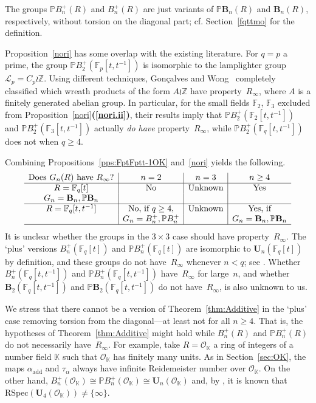 \documentclass[a4paper,11pt]{amsart}
\numberwithin{equation}{section}
\theoremstyle{plain}
\theoremstyle{definition}
\newenvironment{rmk}
  {\pushQED{\qed}\renewcommand{\qedsymbol}{$\triangle$}\rmkx}
  {\popQED\endrmkx}
\newcommand{\Z}{\mathbb{Z}}
\newcommand{\K}{\mathbb{K}}
\newcommand{\F}{\mathbb{F}}
\newcommand{\laurent}[1]{#1[t,t^{-1}]}
\newcommand{\ri}{\mathcal{O}}
\newcommand{\mbU}{\mathbf{U}} %
\newcommand{\mbB}{\mathbf{B}} %
\newcommand{\PB}{\mathbb{P}\mathbf{B}} %
\newcommand{\PBplus}{\mathbb{P}B^{+}} %
\newcommand{\mc}{\mathcal}
\newcommand{\Ri}{R_{\infty}} %
\newcommand{\RSpec}{\mathrm{RSpec}}
\newcommand{\dref}[2]{\ref{#1}{\bf(\ref{#2})}} %
\begin{document}
The groups $\PBplus_n(R)$ and $B_n^+(R)$ are just variants of $\PB_n(R)$ and $\mbB_n(R)$, respectively, without torsion on the diagonal part; cf. Section~\ref{fqttmo} for the definition. 

Proposition~\ref{nori} has some overlap with the existing literature. For $q = p$ a prime, the group $\PBplus_2(\F_p[t,t^{-1}])$ is isomorphic to the lamplighter group $\mc{L}_p = C_p \wr \Z$. 
Using different techniques, Gon\c{c}alves and Wong~\cite{DacibergWongWreath} completely classified which wreath products of the form $A \wr \Z$ have property~$\Ri$, where $A$ is a finitely generated abelian group. In particular, for the small fields $\F_2$, $\F_3$ excluded from Proposition~\dref{nori}{nori.ii}, their results imply that $\PBplus_2(\laurent{\F_2})$ and $\PBplus_2(\laurent{\F_3})$ actually \emph{do have} property~$\Ri$, while $\PBplus_2(\laurent{\F_q})$ does not when $q\geq 4$.

Combining Propositions~\ref{pps:FptFptt-1OK} and~\ref{nori} yields the following. 
\[
\begin{array}{c|c|c|c} 
\text{Does } G_n(R) \text{ have } \Ri ? & n = 2 & n = 3 & n \geq 4 \\ 
\hline 
R = \F_q[t] & \text{No} & \text{Unknown}	&	\text{Yes} \\ 
G_n = \mbB_n, \PB_n &  & & \\
\hline  
R = \F_q[t,t^{-1}] & \text{No, if } q \geq 4, & \text{Unknown}	&	\text{Yes, if} \\ 
& G_n = B_n^+, \PBplus_n & & G_n = \mbB_n, \PB_n \\
\hline
\end{array}
\]
It is unclear whether the groups in the $3\times 3$ case should have property~$\Ri$. The `plus' versions $B_n^+(\F_q[t])$ and $\PBplus_n(\F_q[t])$ are isomorphic to $\mbU_n(\F_q[t])$ by definition, and these groups do not have~$\Ri$ whenever $n < q$; see \cite[Proposition~8]{TimurUniTri}. Whether $B_n^+(\laurent{\F_q})$ and $\PBplus_n(\laurent{\F_q})$ have~$\Ri$ for large~$n$, and whether $\mbB_2(\laurent{\F_q})$ and $\PB_2(\laurent{\F_q})$ do not have~$\Ri$, is also unknown to us. 

\begin{rmk}
We stress that there cannot be a version of Theorem~\ref{thm:Additive} in the `plus' case removing torsion from the diagonal---at least not for all $n \geq 4$. That is, the hypotheses of Theorem~\ref{thm:Additive} might hold while $B_n^+(R)$ and $\PBplus_n(R)$ do not necessarily have~$\Ri$. For example, take $R = \ri_\K$ a ring of integers of a number field $\K$ such that $\ri_\K$ has finitely many units. As in Section~\ref{sec:OK}, the maps $\alpha_{\mathrm{add}}$ and $\tau_\alpha$ always have infinite Reidemeister number over $\ri_\K$. On the other hand, $B_n^+(\ri_\K) \cong \PBplus_n(\ri_\K) \cong \mbU_n(\ri_\K)$ and, by \cite[Proposition~8]{TimurUniTri}, it is known that $\RSpec(\mbU_4(\ri_\K)) \neq \{\infty\}$. 
\end{rmk}
\end{document}
